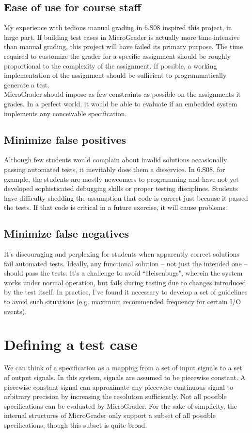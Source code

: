 \documentclass[12pt]{article}
\begin{document}
\subsection{Ease of use for course staff}
My experience with tedious manual grading in 6.S08 inspired this project, in large part.  If building test cases in MicroGrader is actually more time-intensive than manual grading, this project will have failed its primary purpose.  The time required to customize the grader for a specific assignment should be roughly proportional to the complexity of the assignment.  If possible, a working implementation of the assignment should be sufficient to programmatically generate a test.\\

MicroGrader should impose as few constraints as possible on the assignments it grades.  In a perfect world, it would be able to evaluate if an embedded system implements any conceivable specification.

\subsection{Minimize false positives}
Although few students would complain about invalid solutions occasionally passing automated tests, it inevitably does them a disservice.  In 6.S08, for example, the students are mostly newcomers to programming and have not yet developed sophisticated debugging skills or proper testing disciplines.  Students have difficulty shedding the assumption that code is correct just because it passed the tests.  If that code is critical in a future exercise, it will cause problems.

\subsection{Minimize false negatives}
It's discouraging and perplexing for students when apparently correct solutions fail automated tests.  Ideally, any functional solution -- not just the intended one -- should pass the tests.  It's a challenge to avoid ``Heisenbugs", wherein the system works under normal operation, but fails during testing due to changes introduced by the test itself.  In practice, I've found it necessary to develop a set of guidelines to avoid such situations (e.g. maximum recommended frequency for certain I/O events).

\newpage
\section{Defining a test case}
We can think of a specification as a mapping from a set of input signals to a set of output signals.  In this system, signals are assumed to be piecewise constant.  A piecewise constant signal can approximate any piecewise continuous signal to arbitrary precision by increasing the resolution sufficiently.  Not all possible specifications can be evaluated by MicroGrader.  For the sake of simplicity, the internal structures of MicroGrader only support a subset of all possible specifications, though this subset is quite broad.
\end{document}
